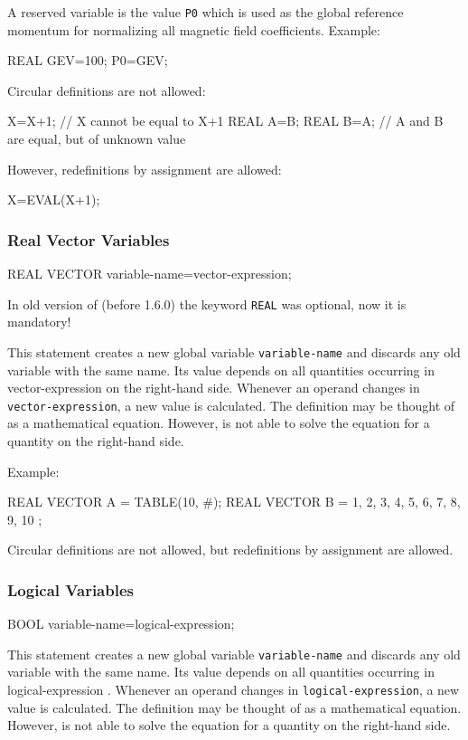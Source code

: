 A reserved variable is the value \texttt{P0} which is used as the
global reference momentum for normalizing all magnetic field coefficients.
\noindent Example:
\begin{example}
REAL GEV=100;
P0=GEV;
\end{example}
Circular definitions are not allowed:
\begin{example}
X=X+1;    // X cannot be equal to X+1
REAL A=B;
REAL B=A;      // A and B are equal, but of unknown value
\end{example}
However, redefinitions by assignment are allowed:
\begin{example}
X=EVAL(X+1);
\end{example}

\subsubsection{Real Vector Variables}
\begin{example}
REAL VECTOR variable-name=vector-expression;
\end{example}
In old version of \opal (before 1.6.0) the keyword \texttt{REAL} was
optional, now it is mandatory!

This statement creates a new global variable \texttt{variable-name}
and discards any old variable with the same name.
Its value depends on all quantities occurring
in {vector-expression}  on the right-hand side.
Whenever an operand changes in \texttt{vector-expression},
a new value is calculated.
The definition may be thought of as a mathematical equation.
However, \opal is not able to solve the equation for a quantity on the
right-hand side.

\noindent Example:
\begin{example}
REAL VECTOR A = TABLE(10, #);
REAL VECTOR B = { 1, 2, 3, 4, 5, 6, 7, 8, 9, 10 };
\end{example}
Circular definitions are not allowed, but redefinitions by assignment
are allowed.

\subsubsection{Logical Variables}
\begin{example}
BOOL variable-name=logical-expression;
\end{example}
This statement creates a new global variable \texttt{variable-name}
and discards any old variable with the same name.
Its value depends on all quantities occurring
in {logical-expression} .
Whenever an operand changes in \texttt{logical-expression},
a new value is calculated.
The definition may be thought of as a mathematical equation.
However, \opal is not able to solve the equation for a quantity on the
right-hand side.

